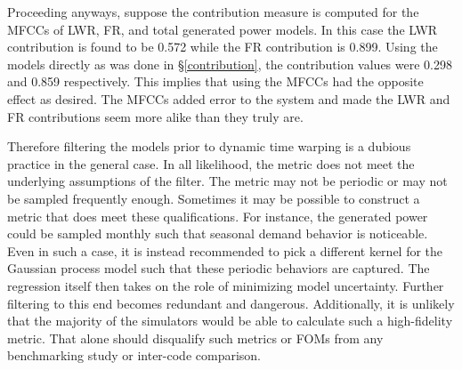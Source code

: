 Proceeding anyways, suppose the contribution measure is computed for the MFCCs 
of LWR, FR, and 
total generated power models.  In this case the LWR contribution is found to be 
0.572 while the FR contribution is 0.899. Using the models directly as was done 
in \S\ref{contribution}, the contribution values were 0.298 and 0.859 respectively.
This implies that using the MFCCs had the opposite effect as desired.  The MFCCs
added error to the system and made the LWR and FR contributions seem more alike than 
they truly are.

Therefore filtering the models prior to dynamic time warping is a dubious practice
in the general case. In all likelihood, the metric does not meet the underlying 
assumptions of the filter. The metric may not be periodic or may not be sampled 
frequently enough. Sometimes it may be possible to construct a metric that does
meet these qualifications. For instance, the generated power could be sampled monthly  
such that seasonal demand behavior is noticeable. Even in such a case, it is instead recommended
to pick a different kernel for the Gaussian process model such that these 
periodic behaviors are captured.  The regression itself then takes on the role of 
minimizing model uncertainty. Further filtering to this end becomes redundant and
dangerous.  Additionally, it is unlikely that 
the majority of the simulators would be able to calculate such a high-fidelity metric.
That alone should disqualify such metrics or FOMs from any benchmarking study or
inter-code comparison.
